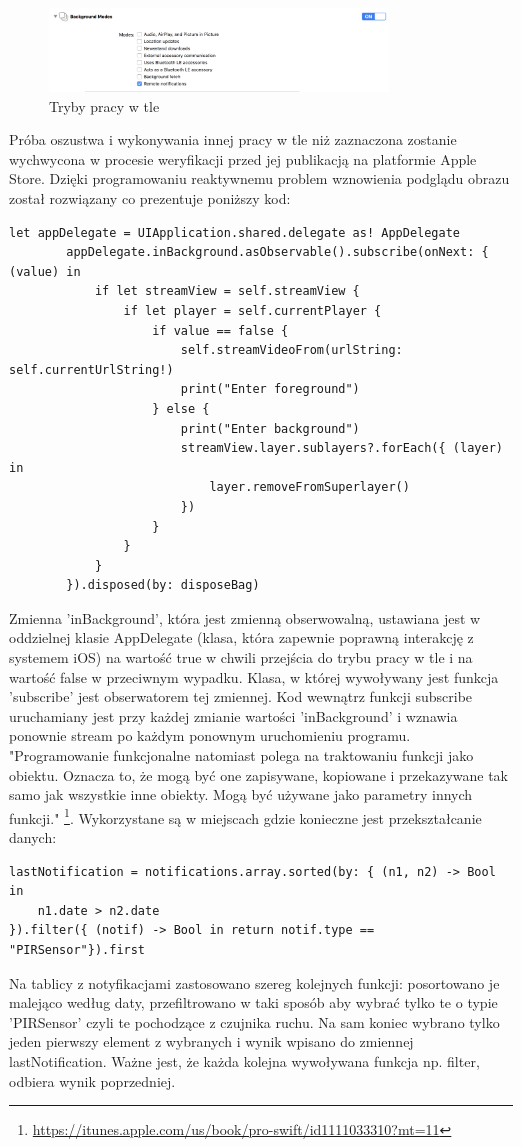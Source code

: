 \begin{figure}[ht]
	\centering
	\includegraphics[width=9cm]{backgroundModes}
	\caption{Tryby pracy w tle}
\end{figure}
Próba oszustwa i wykonywania innej pracy w tle niż zaznaczona zostanie wychwycona w procesie weryfikacji przed jej publikacją na platformie Apple Store. Dzięki programowaniu reaktywnemu problem wznowienia podglądu obrazu został rozwiązany co prezentuje poniższy kod:
\begin{verbatim}
let appDelegate = UIApplication.shared.delegate as! AppDelegate
        appDelegate.inBackground.asObservable().subscribe(onNext: { (value) in
            if let streamView = self.streamView {
                if let player = self.currentPlayer {
                    if value == false {
                        self.streamVideoFrom(urlString: self.currentUrlString!)
                        print("Enter foreground")
                    } else {
                        print("Enter background")
                        streamView.layer.sublayers?.forEach({ (layer) in
                            layer.removeFromSuperlayer()
                        })
                    }
                }
            }
        }).disposed(by: disposeBag)
\end{verbatim}
Zmienna 'inBackground', która jest zmienną obserwowalną, ustawiana jest w oddzielnej klasie AppDelegate (klasa, która zapewnie poprawną interakcję z systemem iOS) na wartość true w chwili przejścia do trybu pracy w tle i na wartość false w przeciwnym wypadku. Klasa, w której wywoływany jest funkcja 'subscribe' jest obserwatorem tej zmiennej. Kod wewnątrz funkcji subscribe uruchamiany jest przy każdej zmianie wartości 'inBackground' i wznawia ponownie stream po każdym ponownym uruchomieniu programu.
"Programowanie funkcjonalne natomiast polega na traktowaniu funkcji jako obiektu. Oznacza to, że mogą być one zapisywane, kopiowane i przekazywane tak samo jak wszystkie inne obiekty. Mogą być używane jako parametry innych funkcji." \footnote{\url{https://itunes.apple.com/us/book/pro-swift/id1111033310?mt=11}}. Wykorzystane są w miejscach gdzie konieczne jest przekształcanie danych:
\begin{verbatim}
lastNotification = notifications.array.sorted(by: { (n1, n2) -> Bool in
	n1.date > n2.date 
}).filter({ (notif) -> Bool in return notif.type == "PIRSensor"}).first
\end{verbatim}
Na tablicy z notyfikacjami zastosowano szereg kolejnych funkcji: posortowano je malejąco według daty, przefiltrowano w taki sposób aby wybrać tylko te o typie 'PIRSensor' czyli te pochodzące z czujnika ruchu. Na sam koniec wybrano tylko jeden pierwszy element z wybranych i wynik wpisano do zmiennej lastNotification. Ważne jest, że każda kolejna wywoływana funkcja np. filter, odbiera wynik poprzedniej. 

